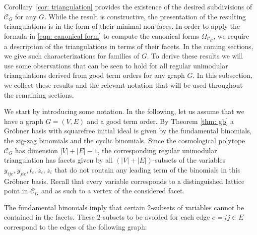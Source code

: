 \documentclass[11pt]{article}
\theoremstyle{definition}
\numberwithin{equation}{section}
\begin{document}
Corollary~\ref{cor: triangulation} provides the existence of the desired subdivisions of $\mathcal{C}_G$ for any $G$.  
While the result is constructive, the presentation of the resulting triangulations is in the form of their minimal non-faces. 
In order to apply the formula in \eqref{eqn: canonical form} to compute the canonical forms $\Omega_{\mathcal{C}_G}$, we require a description of the triangulations in terms of their facets. 
In the coming sections, we give such characterizations for families of $G$. 
To derive these results we will use some observations that can be seen to hold for all regular unimodular triangulations derived from good term orders for any graph $G$. 
In this subsection, we collect these results and the relevant notation that will be used throughout the remaining sections. 

We start by introducing some notation.
In the following, let us assume that we have a graph $G=(V,E)$ and a good term order. 
By Theorem \ref{thm: gb} a Gr\"obner basis with squarefree initial ideal is given by the fundamental binomials, the zig-zag binomials and the cyclic binomials.
Since the cosmological polytope $\mathcal{C}_{G}$ has dimension $|V| + |E| -1$, the corresponding regular unimodular triangulation has facets given by all $(|V|+|E|)$-subsets of the variables $y_{ije}, y_{jie}, t_e, z_e, z_i$ that do not contain any leading term of the binomials in this Gr\"obner basis. Recall that every variable corresponds to a distinguished lattice point in $\mathcal{C}_G$ and as such to a vertex of the considered facet. 

The fundamental binomials imply that certain 2-subsets of variables cannot be contained in the facets.  
These 2-subsets to be avoided for each edge $e=ij\in E$ correspond to the edges of the following graph:
\begin{center}
\end{center}
\end{document}
